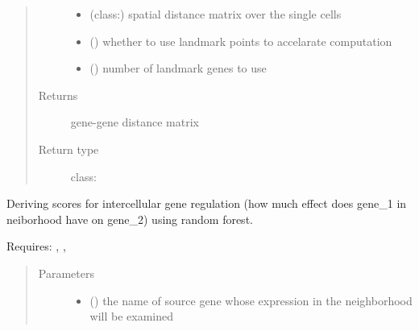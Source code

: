 \documentclass[letterpaper,10pt,english]{sphinxmanual}
\begin{document}
\begin{fulllineitems}
\begin{fulllineitems}
\begin{quote}
\begin{description}
\begin{itemize}
\item {} 
 (class:) \textendash{} spatial distance matrix over the single cells

\item {} 
 (\sphinxstyleliteralemphasis{, }) \textendash{} whether to use landmark points to accelarate computation

\item {} 
 (\sphinxstyleliteralemphasis{, }) \textendash{} number of landmark genes to use

\end{itemize}

\item[{Returns}] \leavevmode
gene-gene distance matrix

\item[{Return type}] \leavevmode
class:

\end{description}\end{quote}

\end{fulllineitems}


\begin{fulllineitems}
\label{\detokenize{api:spaotsc.SpaOTsc.spatial_sc.gene_pair_ml_effect_range}}
Deriving scores for intercellular gene regulation (how much effect does gene\_1 in neiborhood have on gene\_2) using random forest.

Requires: , , 
\begin{quote}\begin{description}
\item[{Parameters}] \leavevmode\begin{itemize}
\item {} 
 () \textendash{} the name of source gene whose expression in the neighborhood will be examined


\end{itemize}
\end{description}
\end{quote}
\end{fulllineitems}
\end{fulllineitems}
\end{document}
